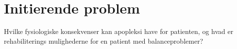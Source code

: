 \section{Initierende problem}
Hvilke fysiologiske konsekvenser kan apopleksi have for patienten, og hvad er rehabiliterings mulighederne for en patient med balanceproblemer? 

% 